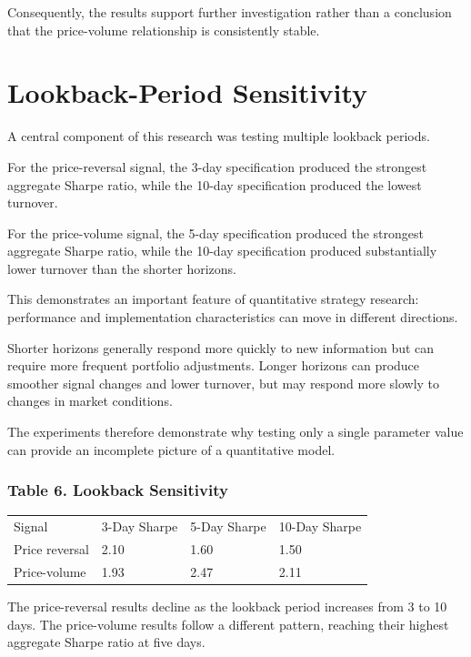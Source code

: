 \documentclass{article}
\begin{document}
Consequently, the results support further investigation rather than a conclusion that the price-volume relationship is consistently stable.

\section{Lookback-Period Sensitivity}

A central component of this research was testing multiple lookback periods.

For the price-reversal signal, the 3-day specification produced the strongest aggregate Sharpe ratio, while the 10-day specification produced the lowest turnover.

For the price-volume signal, the 5-day specification produced the strongest aggregate Sharpe ratio, while the 10-day specification produced substantially lower turnover than the shorter horizons.

This demonstrates an important feature of quantitative strategy research: performance and implementation characteristics can move in different directions.

Shorter horizons generally respond more quickly to new information but can require more frequent portfolio adjustments. Longer horizons can produce smoother signal changes and lower turnover, but may respond more slowly to changes in market conditions.

The experiments therefore demonstrate why testing only a single parameter value can provide an incomplete picture of a quantitative model.

\subsubsection{Table 6. Lookback Sensitivity}

\begin{table}
\centering

\begin{tabular}{l l l l}
Signal & 3-Day Sharpe & 5-Day Sharpe & 10-Day Sharpe \\

Price reversal & 2.10 & 1.60 & 1.50 \\
Price-volume & 1.93 & 2.47 & 2.11 \\

\end{tabular}

\end{table}

The price-reversal results decline as the lookback period increases from 3 to 10 days. The price-volume results follow a different pattern, reaching their highest aggregate Sharpe ratio at five days.
\end{document}
